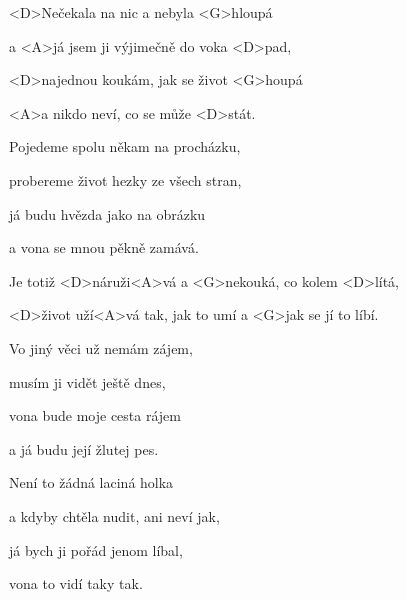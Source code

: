 

\zs
<D>Nečekala na nic a nebyla <G>hloupá

a <A>já jsem ji výjimečně do voka <D>pad,

<D>najednou koukám, jak se život <G>houpá

<A>a nikdo neví, co se může <D>stát.
\ks

\zs
Pojedeme spolu někam na procházku,

probereme život hezky ze všech stran,

já budu hvězda jako na obrázku

a vona se mnou pěkně zamává.
\ks

\zr
Je totiž <D>náruži<A>vá a <G>nekouká, co kolem <D>lítá,

<D>život uží<A>vá tak, jak to umí a <G>jak se jí to líbí.
\kr

\zs
Vo jiný věci už nemám zájem,

musím ji vidět ještě dnes,

vona bude moje cesta rájem

a já budu její žlutej pes.
\ks

\zs
Není to žádná laciná holka

a kdyby chtěla nudit, ani neví jak,

já bych ji pořád jenom líbal,

vona to vidí taky tak.
\ks

\zr \kr \zr \kr

\kp
